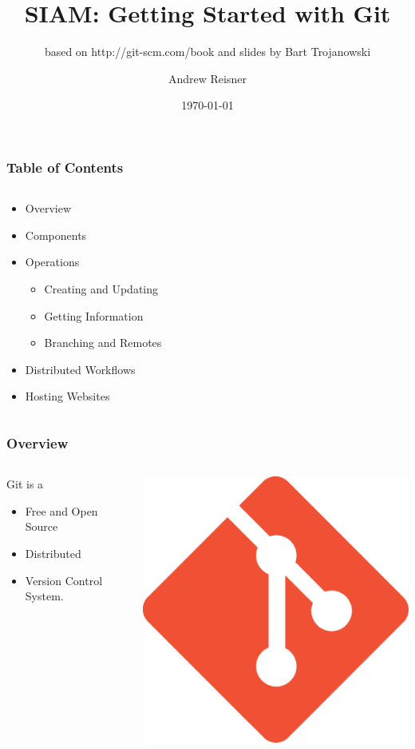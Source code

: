 \documentclass[english,compress]{beamer}
\title{SIAM: Getting Started with Git}
\subtitle{based on http://git-scm.com/book and slides by Bart Trojanowski}
\author{Andrew Reisner}
\date{\today}
\begin{document}
\frame{\titlepage}

\frame
{
    \frametitle{Table of Contents}
    \begin{columns}
    \begin{column}{.5\textwidth}
        \begin{itemize}
            \item Overview
            \item Components
            \item Operations
			\begin{itemize}
				\item Creating and Updating
				\item Getting Information
				\item Branching and Remotes
			\end{itemize}
			\item Distributed Workflows
			\item Hosting Websites
        \end{itemize}
    \end{column}
    \end{columns}
}

\frame
{
    \frametitle{Overview}
    \begin{columns}
    \begin{column}{.5\textwidth}
        Git is a
        \begin{itemize}
            \item Free and Open Source
            \item Distributed
            \item Version Control System.
        \end{itemize}
    \end{column}
    \begin{column}{.5\textwidth}
        \begin{center}
            \includegraphics[width=.7\textwidth]{figs/git-logo.png} 
        \end{center}
    \end{column}
    \end{columns}
}
\end{document}
